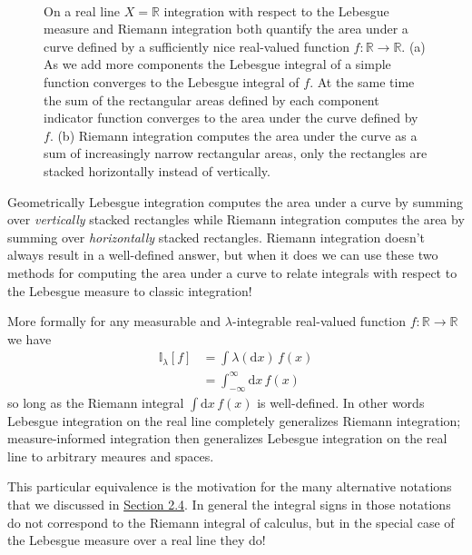 \documentclass[
  letterpaper,
  DIV=11,
  numbers=noendperiod]{scrartcl}
\begin{document}
\begin{figure}
\begin{minipage}[t]{0.90\linewidth}
{}

\subcaption{\label{fig-riemann}}
\end{minipage}%
%
\begin{minipage}[t]{0.05\linewidth}

{\centering 

~

}

\end{minipage}%

\caption{\label{fig-integrate}On a real line \(X = \mathbb{R}\)
integration with respect to the Lebesgue measure and Riemann integration
both quantify the area under a curve defined by a sufficiently nice
real-valued function \(f : \mathbb{R} \rightarrow \mathbb{R}\). (a) As
we add more components the Lebesgue integral of a simple function
converges to the Lebesgue integral of \(f\). At the same time the sum of
the rectangular areas defined by each component indicator function
converges to the area under the curve defined by \(f\). (b) Riemann
integration computes the area under the curve as a sum of increasingly
narrow rectangular areas, only the rectangles are stacked horizontally
instead of vertically.}

\end{figure}

Geometrically Lebesgue integration computes the area under a curve by
summing over \emph{vertically} stacked rectangles while Riemann
integration computes the area by summing over \emph{horizontally}
stacked rectangles. Riemann integration doesn't always result in a
well-defined answer, but when it does we can use these two methods for
computing the area under a curve to relate integrals with respect to the
Lebesgue measure to classic integration!

More formally for any measurable and \(\lambda\)-integrable real-valued
function \(f: \mathbb{R} \rightarrow \mathbb{R}\) we have \begin{align*}
\mathbb{I}_{\lambda}[f]
&= \int \lambda( \mathrm{d} x) \, f(x)
\\
&= \int_{-\infty}^{\infty} \mathrm{d} x \, f(x)
\end{align*} so long as the Riemann integral
\(\int \mathrm{d} x \, f(x)\) is well-defined. In other words Lebesgue
integration on the real line completely generalizes Riemann integration;
measure-informed integration then generalizes Lebesgue integration on
the real line to arbitrary meaures and spaces.

This particular equivalence is the motivation for the many alternative
notations that we discussed in \href{@sec:alt_notations}{Section 2.4}.
In general the integral signs in those notations do not correspond to
the Riemann integral of calculus, but in the special case of the
Lebesgue measure over a real line they do!
\end{document}
